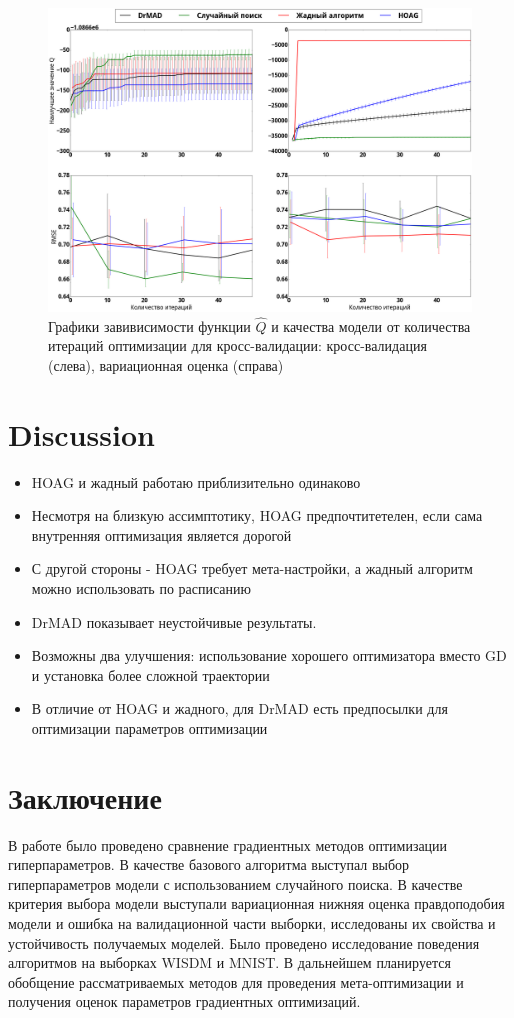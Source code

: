 \documentclass[12pt]{article}
\begin{document}
    \begin{figure}

    \includegraphics[width=\linewidth]{plots/wisdm.png}

    \caption{Графики завивисимости функции $\hat{Q}$ и качества модели от количества итераций оптимизации для кросс-валидации:  кросс-валидация (слева), вариационная оценка (справа)}
    \end{figure}




\section{Discussion}
\begin{itemize}
\item HOAG и жадный работаю приблизительно одинаково
\item Несмотря на близкую ассимптотику, HOAG предпочтитетелен, если сама внутренняя оптимизация является дорогой
\item С другой стороны - HOAG требует мета-настройки, а жадный алгоритм можно использовать по расписанию
\item DrMAD показывает неустойчивые результаты. 
\item Возможны два улучшения: использование хорошего оптимизатора вместо GD и установка более сложной траектории
\item В отличие от HOAG и жадного, для DrMAD есть предпосылки для оптимизации параметров оптимизации
\end{itemize}
\section{Заключение}
В работе было проведено сравнение градиентных методов оптимизации гиперпараметров.  В качестве базового алгоритма выступал выбор гиперпараметров модели с использованием случайного поиска. В качестве критерия выбора модели выступали вариационная нижняя оценка правдоподобия модели и ошибка на валидационной части выборки, исследованы их свойства и устойчивость получаемых моделей. Было проведено исследование поведения алгоритмов на выборках WISDM и MNIST. В дальнейшем планируется обобщение рассматриваемых методов для проведения мета-оптимизации и получения оценок параметров градиентных оптимизаций.



%

\end{document}
